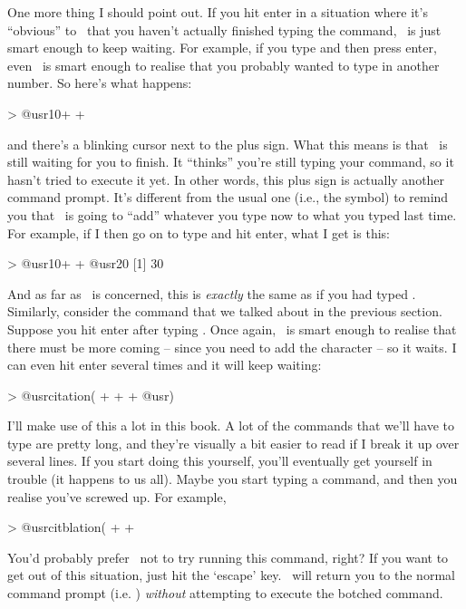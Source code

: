 
One more thing I should point out. If you hit enter in a situation where it's ``obvious'' to \R\ that you haven't actually finished typing the command, \R\ is just smart enough to keep waiting. For example, if you type  and then press enter, even \R\ is smart enough to realise that you probably wanted to type in another number. So here's what happens:
\begin{rblock1}
> @usr{10+}
+ 
\end{rblock1}
and there's a blinking cursor next to the plus sign. What this means is that \R\ is still waiting for you to finish. It ``thinks'' you're still typing your command, so it hasn't tried to execute it yet. In other words, this plus sign is actually another command prompt. It's different from the usual one (i.e., the \rtextoutput{>} symbol) to remind you that \R\ is going to ``add'' whatever you type now to what you typed last time. For example, if I then go on to type  and hit enter, what I get is this:
\begin{rblock1}
> @usr{10+}
+ @usr{20}
[1] 30
\end{rblock1}
And as far as \R\ is concerned, this is {\it exactly} the same as if you had typed . Similarly, consider the  command that we talked about in the previous section. Suppose you hit enter after typing . Once again, \R\ is smart enough to realise that there must be more coming -- since you need to add the \rtext{)} character --  so it waits. I can even hit enter several times and it will keep waiting: 
\begin{rblock1}
> @usr{citation(}
+ 
+ 
+ @usr{)}
\end{rblock1}
I'll make use of this a lot in this book. A lot of the commands that we'll have to type are pretty long, and they're visually a bit easier to read if I break it up over several lines. If you start doing this yourself, you'll eventually get yourself in trouble (it happens to us all). Maybe you start typing a command, and then you realise you've screwed up. For example,
\begin{rblock1}
> @usr{citblation( }
+ 
+ 
\end{rblock1}
You'd probably prefer \R\ not to try running this command, right? If you want to get out of this situation, just hit the `escape' key. \R\ will return you to the normal command prompt (i.e. \rtext{>}) {\it without} attempting to execute the botched command.


